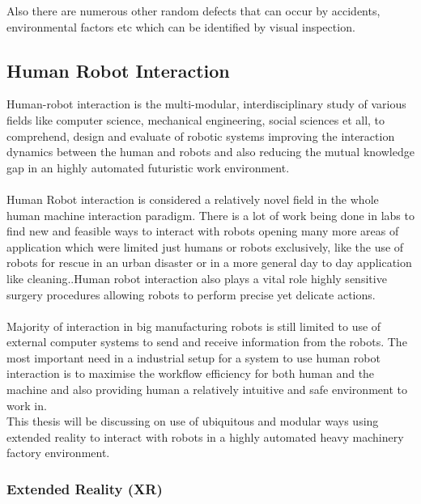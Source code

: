\documentclass{article}
\begin{document}
    Also there are numerous other random defects that can occur by accidents, environmental factors etc which can be identified by visual inspection.
    
    

        
    
\quad \quad

\subsection{Human Robot Interaction}

Human-robot interaction is the multi-modular, interdisciplinary study of various fields like computer science, mechanical engineering, social sciences et all, to comprehend, design and evaluate of robotic systems improving the interaction dynamics between the human and robots and also reducing the mutual knowledge gap in an highly automated futuristic work environment. \\ \\
Human Robot interaction is considered a relatively novel field in the whole human machine interaction paradigm. There is a lot of work being done in labs to find new and feasible ways to interact with robots opening many more areas of application which were limited just humans or robots exclusively, like the use of robots for rescue in an urban disaster\cite{Murphy:2004:HIR:2220413.2220787} or in a more general day to day application like cleaning.\cite{cleaningRobot}.Human robot interaction also plays a vital role highly sensitive surgery procedures allowing robots to perform precise yet delicate actions.\cite{hriSurgery}\\
\\
Majority of interaction in big manufacturing robots is still limited to use of external computer systems to send and receive information from the robots.
The most important need in a industrial setup for a system to use human robot interaction is to maximise the workflow efficiency for both human and the machine and also providing human a relatively intuitive and safe environment to work in.\\

This thesis will be discussing on use of ubiquitous and modular ways using extended reality to interact with robots in a highly automated heavy machinery factory environment.

\subsubsection{Extended Reality (XR)}
\end{document}
